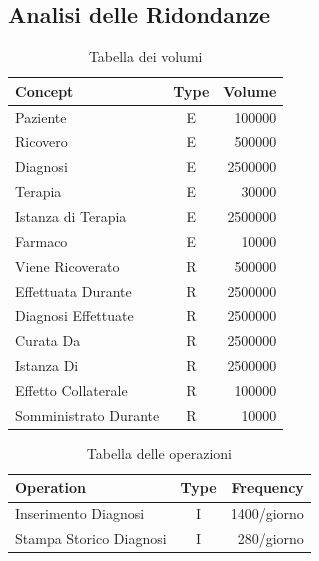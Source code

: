 \documentclass{article}
\begin{document}
\subsection{Analisi delle Ridondanze}
\begin{table}[!ht]
  \caption{Tabella dei volumi}
  \label{table:1}
  \centering
  \begin{tabular}{|l|c|r|}
  \hline
  \textbf{Concept} & \textbf{Type} & \textbf{Volume} \\ \hline
  Paziente & E & 100000 \\ \hline
  Ricovero & E & 500000 \\ \hline
  Diagnosi & E & 2500000 \\ \hline
  Terapia & E & 30000 \\ \hline
  Istanza di Terapia & E & 2500000 \\ \hline
  Farmaco & E & 10000 \\ \hline
  Viene Ricoverato & R & 500000 \\ \hline
  Effettuata Durante & R & 2500000 \\ \hline
  Diagnosi Effettuate & R & 2500000 \\ \hline
  Curata Da & R & 2500000 \\ \hline
  Istanza Di & R & 2500000 \\ \hline
  Effetto Collaterale & R & 100000 \\ \hline
  Somministrato Durante  & R & 10000 \\ \hline
  \end{tabular}
  \end{table}
\begin{table}[!ht]
  \caption{Tabella delle operazioni}
  \label{table:2}
  \centering
  \begin{tabular}{|l|c|r|}
  \hline
  \textbf{Operation} & \textbf{Type} & \textbf{Frequency} \\ \hline
  Inserimento Diagnosi & I & 1400/giorno \\ \hline
  Stampa Storico Diagnosi & I & 280/giorno \\ \hline
  \end{tabular}
  \end{table}
\end{document}
